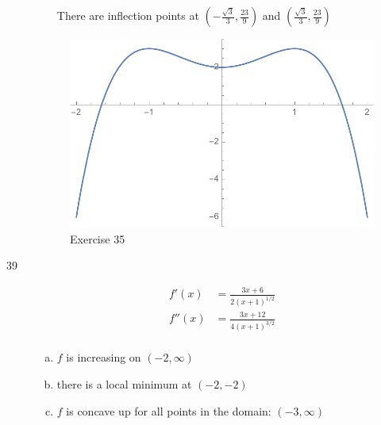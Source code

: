 \documentclass[letterpaper, landscape]{exam}
\begin{document}
\begin{description}
\begin{enumerate}[(a)]
          There are inflection points at $\left( -\frac{\sqrt{3}}{3}, \frac{23}{9} \right)$ and 
          $\left( \frac{\sqrt{3}}{3}, \frac{23}{9} \right)$

      \end{enumerate}

      \begin{figure}[H]
        \centering
        \includegraphics[scale = 0.6]{ex35.pdf}
        \caption{Exercise 35}
        \label{fig:ex35}
      \end{figure}

    \newpage

    \item[39]
      \begin{align*}
        f'(x)  & = \frac{3x + 6}{2 (x + 1)^{1/2}} \\
        f''(x) & = \frac{3x + 12}{4 (x + 1)^{3/2}} \\
      \end{align*}

      \begin{enumerate}[(a)]
        \item $f$ is increasing on $(-2, \infty)$

        \item there is a local minimum at $(-2, -2)$ 

        \item $f$ is concave up for all points in the domain: $(-3, \infty)$

      \end{enumerate}


\end{description}
\end{document}
